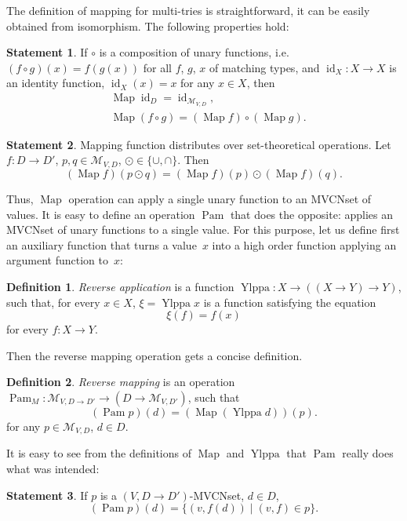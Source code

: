 \documentclass{article}
\theoremstyle{definition}
\newtheorem{Df}{Definition}
\newtheorem{St}{Statement}
\newcommand{\setcharmvcn}{M}
\newcommand{\setsymbol}[3]{\mathcal{#1}_{#2,#3}}
\newcommand{\setmvcn}[2]{\setsymbol{\setcharmvcn}{#1}{#2}}
\newcommand{\fmap}{\operatorname{Map}}
\newcommand{\fpam}{\operatorname{Pam}}
\newcommand{\id}{\operatorname{id}}
\newcommand{\ylppa}{\operatorname{Ylppa}}
\begin{document}
The definition of mapping for multi-tries is straightforward, it can be easily
obtained from isomorphism. The following properties hold:

\begin{St}\label{st:map-properties}
If $\circ$ is a composition of unary functions, i.e. $(f\circ g)(x) = f(g(x))$ for
all $f$, $g$, $x$ of matching types, and $\id_X : X \to X$ is an identity function,
$\id_X(x) = x$ for any $x\in X$, then
\begin{eqnarray*}
  & \fmap \id_D = \id_{\setmvcn{V}{D}} , \\
  & \fmap (f \circ g) = (\fmap f) \circ (\fmap g) .
\end{eqnarray*}
\end{St}

\begin{St}\label{st:map-distributivity}
Mapping function distributes over set-theoretical operations.
Let $f: D \to D'$, $p, q \in \setmvcn{V}{D}$, $\odot \in \{\cup, \cap \}$. Then
\[
  (\fmap f) (p \odot q) = (\fmap f)(p) \odot (\fmap f)(q) .
\]
\end{St}

Thus, $\fmap$ operation can apply a single unary function to an MVCNset of
values. It is easy to define an operation $\fpam$ that does the opposite:
applies an MVCNset of unary functions to a single value. For this purpose,
let us define first an auxiliary function that turns a value~$x$ into a
high order function applying an argument function to~$x$:

\begin{Df}\label{df:ylppa}
\emph{Reverse application} is a function $\ylppa : X \to ((X \to Y) \to Y)$,
such that, for every $x\in X$, $\xi = \ylppa x$ is a function satisfying the
equation
\[
  \xi(f) = f(x)
\]
for every $f: X\to Y$.
\end{Df}

Then the reverse mapping operation gets a concise definition.

\begin{Df}\label{df:mvcn-pam}
\emph{Reverse mapping} is an operation
$\fpam_{\setcharmvcn} : \setmvcn{V}{D \to D'} \to (D \to \setmvcn{V}{D'})$,
such that
\[
  (\fpam p)(d) = (\fmap (\ylppa d))(p) .
\]
for any $p\in \setmvcn{V}{D}$, $d\in D$.
\end{Df}

It is easy to see from the definitions of $\fmap$ and $\ylppa$ that $\fpam$
really does what was intended:

\begin{St}\label{st:mvcn-pam}
If $p$ is a $(V, D\to D')$-MVCNset, $d\in D$,
\[
  (\fpam p)(d) = \{ (v, f(d)) \mid (v, f) \in p \} .
\]
\end{St}
\end{document}

